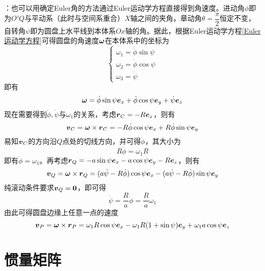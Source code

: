 \begin{solution}
：也可以用确定Euler角的方法通过Euler运动学方程直接得到角速度。进动角$\phi$即为$O'Q$与平动系（此时与空间系重合）$X$轴之间的夹角，章动角$\theta = \dfrac{\pi}{2}$恒定不变，自转角$\psi$即为圆盘上水平线到本体系$Ox$轴的角。据此，根据Euler运动学方程\eqref{Euler运动学方程}可得圆盘的角速度$\boldsymbol{\omega}$在本体系中的坐标为
\begin{equation*}
	\begin{cases}
		\omega_1 = \dot{\phi} \sin \psi \\
		\omega_2 = \dot{\phi} \cos \psi \\
		\omega_3 = \dot{\psi}
	\end{cases}
\end{equation*}
即有
\begin{equation*}
	\boldsymbol{\omega} = \dot{\phi} \sin \psi \boldsymbol{e}_x + \dot{\phi} \cos \psi \boldsymbol{e}_y + \dot{\psi} \boldsymbol{e}_z
\end{equation*}
现在需要得到$\dot{\phi},\dot{\psi}$与$\omega_1$的关系，考虑$\boldsymbol{r}_C = -R\boldsymbol{e}_z$，则有
\begin{equation*}
	\boldsymbol{v}_C = \boldsymbol{\omega} \times \boldsymbol{r}_C = -R\dot{\phi} \cos \psi \boldsymbol{e}_x + R\dot{\phi} \sin \psi \boldsymbol{e}_y
\end{equation*}
易知$\boldsymbol{v}_C$的方向沿$Q$点处的切线方向，并可得$\dot{\phi}$，其大小为
\begin{equation*}
	R\dot{\phi} = \omega_1 R
\end{equation*}
即有$\dot{\phi} = \omega_1$。再考虑$\boldsymbol{r}_Q = -a\sin \psi \boldsymbol{e}_x - a\cos \psi \boldsymbol{e}_y - R\boldsymbol{e}_z$，则有
\begin{equation*}
	\boldsymbol{v}_Q = \boldsymbol{\omega} \times \boldsymbol{r}_Q = (a\dot{\psi}-R\dot{\phi}) \cos \psi \boldsymbol{e}_x - (a\dot{\psi}-R\dot{\phi}) \sin \psi \boldsymbol{e}_y
\end{equation*}
纯滚动条件要求$\boldsymbol{v}_Q = \boldsymbol{0}$，即可得
\begin{equation*}
	\dot{\psi} = \frac{R}{a} \dot{\phi} = \frac{R}{a} \omega_1
\end{equation*}
由此可得圆盘边缘上任意一点的速度
\begin{equation*}
	\boldsymbol{v}_P = \boldsymbol{\omega} \times \boldsymbol{r}_P = \omega_1 R \cos \psi \boldsymbol{e}_x - \omega_1 R(1+\sin \psi) \boldsymbol{e}_y + \omega_1 a \cos \psi \boldsymbol{e}_z
\end{equation*}
\end{solution}

\section{惯量矩阵}

